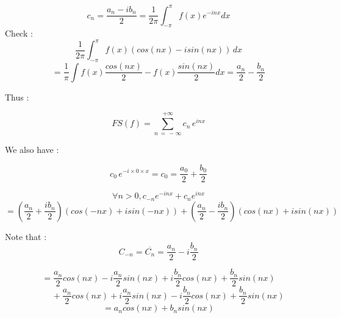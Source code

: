 \documentclass[a4paper,12pt]{article}
\begin{document}
\[
c_n = \frac{a_n - ib_n}{2} = \frac{1}{2\pi}\int_{-\pi}^{\pi}{f(x)e^{-inx}dx}
\]
Check :
\[
\frac{1}{2\pi}\int_{-\pi}^{\pi}{f(x)(cos(nx)-isin(nx)) \,dx} 
\]
\[
= \frac{1}{\pi}\int{f(x)\frac{cos(nx)}{2} - f(x)\frac{sin(nx)}{2}dx} = \frac{a_n}{2} - \frac{b_n}{2}
\]

Thus : 

\[
FS(f) = \sum_{n\,=\,-\infty}^{+\infty}{c_n\,e^{inx}}
\]

\newpage

We also have : 

\[
c_0\,e^{-i\times0\times x} = c_0 = \frac{a_0}{2} + \frac{b_0}{2}
\]

\[
\forall n > 0, c_{-n}e^{-inx} + c_ne^{inx} 
\]
\[
= (\frac{a_n}{2} + \frac{ib_n}{2})(cos(-nx) + isin(-nx)) + (\frac{a_n}{2} - \frac{ib_n}{2})(cos(nx) + isin(nx))
\]

Note that :
\[
C_{-n} = \overline{C_n} = \frac{a_n}{2} - i\frac{b_n}{2}
\]

\[
= \frac{a_n}{2}cos(nx) - i\frac{a_n}{2}sin(nx) + i\frac{b_n}{2}cos(nx) + \frac{b_n}{2}sin(nx) 
\]
\[
\;\;\;\;\;\;\;\; + \frac{a_n}{2}cos(nx) + i\frac{a_n}{2}sin(nx) - i\frac{b_n}{2}cos(nx) + \frac{b_n}{2}sin(nx)
\]
\[
= a_ncos(nx) + b_nsin(nx)
\]
\end{document}
